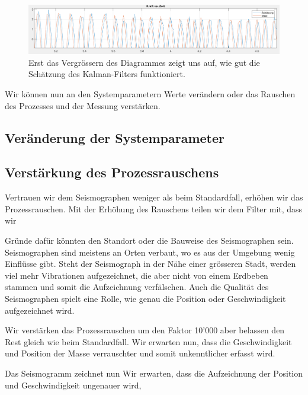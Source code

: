 \begin{figure}
	\begin{center}
		\includegraphics[width=15cm]{papers/erdbeben/Erdbeben_Standardfall_Zoom.PNG}
		\caption{Erst das Vergrössern des Diagrammes zeigt uns auf, wie gut die Schätzung des Kalman-Filters funktioniert.}
	\end{center}
\end{figure}

Wir können nun an den Systemparametern Werte verändern oder das Rauschen des Prozesses und der Messung verstärken.

\subsection{Veränderung der Systemparameter}




\subsection{Verstärkung des Prozessrauschens}
Vertrauen wir dem Seismographen weniger als beim Standardfall, erhöhen wir das Prozessrauschen.
Mit der Erhöhung des Rauschens teilen wir dem Filter mit, dass wir 

Gründe dafür könnten den Standort oder die Bauweise des Seismographen sein.
Seismographen sind meistens an Orten verbaut, wo es aus der Umgebung wenig Einflüsse gibt.
Steht der Seismograph in der Nähe einer grösseren Stadt, werden viel mehr Vibrationen aufgezeichnet, die aber nicht von einem Erdbeben stammen und somit die Aufzeichnung verfälschen.
Auch die Qualität des Seismographen spielt eine Rolle, wie genau die Position oder Geschwindigkeit aufgezeichnet wird.

Wir verstärken das Prozessrauschen um den Faktor 10'000 aber belassen den Rest gleich wie beim Standardfall.
Wir erwarten nun, dass die Geschwindigkeit und Position der Masse verrauschter und somit unkenntlicher erfasst wird.

Das Seismogramm zeichnet nun 
Wir erwarten, dass die Aufzeichnung der Position und Geschwindigkeit ungenauer wird, 

